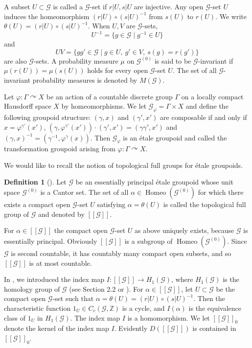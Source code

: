 \documentclass[11pt]{article}
\theoremstyle{definition}
\newtheorem{definition}[theorem]{Definition}
\numberwithin{equation}{section}
\renewcommand{\phi}{\varphi}
\newcommand{\Homeo}{\operatorname{Homeo}}
\newcommand{\G}{\mathcal{G}}
\newcommand{\Z}{\mathbb{Z}}
\begin{document}
A subset $U\subset\G$ is called a $\G$-set if $r|U,s|U$ are injective. 
Any open $\G$-set $U$ induces the homeomorphism 
$(r|U)\circ(s|U)^{-1}$ from $s(U)$ to $r(U)$. 
We write $\theta(U)=(r|U)\circ(s|U)^{-1}$. 
When $U,V$ are $\G$-sets, 
\[
U^{-1}=\{g\in\G\mid g^{-1}\in U\}
\]
and 
\[
UV=\{gg'\in\G\mid g\in U,\ g'\in V,\ s(g)=r(g')\}
\]
are also $\G$-sets. 
A probability measure $\mu$ on $\G^{(0)}$ is said to be $\G$-invariant 
if $\mu(r(U))=\mu(s(U))$ holds for every open $\G$-set $U$. 
The set of all $\G$-invariant probability measures is denoted by $M(\G)$. 

Let $\phi:\Gamma\curvearrowright X$ be 
an action of a countable discrete group $\Gamma$ 
on a locally compact Hausdorff space $X$ by homeomorphisms. 
We let $\G_\phi=\Gamma\times X$ and define the following groupoid structure: 
$(\gamma,x)$ and $(\gamma',x')$ are composable 
if and only if $x=\phi^{\gamma'}(x')$, 
$(\gamma,\phi^{\gamma'}(x'))\cdot(\gamma',x')=(\gamma\gamma',x')$ and 
$(\gamma,x)^{-1}=(\gamma^{-1},\phi^\gamma(x))$. 
Then $\G_\phi$ is an \'etale groupoid and 
called the transformation groupoid 
arising from $\phi:\Gamma\curvearrowright X$. 

We would like to recall 
the notion of topological full groups for \'etale groupoids. 

\begin{definition}[{\cite[Definition 2.3]{M12PLMS}}]\label{defoftfg}
Let $\G$ be an essentially principal \'etale groupoid 
whose unit space $\G^{(0)}$ is a Cantor set. 
The set of all $\alpha\in\Homeo(\G^{(0)})$ for which 
there exists a compact open $\G$-set $U$ 
satisfying $\alpha=\theta(U)$ 
is called the topological full group of $\G$ and denoted by $[[\G]]$. 
\end{definition}

For $\alpha\in[[\G]]$ the compact open $\G$-set $U$ as above uniquely exists, 
because $\G$ is essentially principal. 
Obviously $[[\G]]$ is a subgroup of $\Homeo(\G^{(0)})$. 
Since $\G$ is second countable, it has countably many compact open subsets, 
and so $[[\G]]$ is at most countable. 

In \cite[Section 7]{M12PLMS}, 
we introduced the index map $I:[[\G]]\to H_1(\G)$, 
where $H_1(\G)$ is the homology group of $\G$ 
(see Section 2.2 or \cite[Section 3]{M12PLMS}). 
For $\alpha\in[[\G]]$, 
let $U\subset\G$ be the compact open $\G$-set 
such that $\alpha=\theta(U)=(r|U)\circ(s|U)^{-1}$. 
Then the characteristic function $1_U\in C_c(\G,\Z)$ is a cycle, 
and $I(\alpha)$ is the equivalence class of $1_U$ in $H_1(\G)$. 
The index map $I$ is a homomorphism. 
We let $[[\G]]_0$ denote the kernel of the index map $I$. 
Evidently $D([[\G]])$ is contained in $[[\G]]_0$. 
\end{document}
